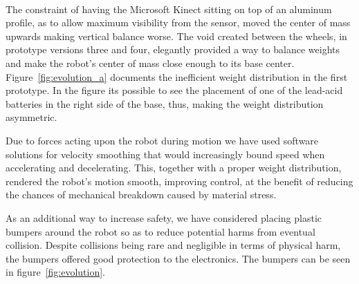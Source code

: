 The constraint of having the Microsoft Kinect\textsuperscript{\textregistered} sitting on top of an aluminum profile, as to allow maximum visibility from the sensor, moved the center of mass upwards making vertical balance worse. The void created between the wheels, in prototype versions three and four, elegantly provided a way to balance weights and make the robot's center of mass close enough to its base center. Figure~\ref{fig:evolution_a} documents the inefficient weight distribution in the first prototype. In the figure its possible to see the placement of one of the lead-acid batteries in the right side of the base, thus, making the weight distribution asymmetric.

Due to forces acting upon the robot during motion we have used software solutions for velocity smoothing that would increasingly bound speed when accelerating and decelerating. This, together with a proper weight distribution, rendered the robot's motion smooth, improving control, at the benefit of reducing the chances of mechanical breakdown caused by material stress.

As an additional way to increase safety, we have considered placing plastic bumpers around the robot so as to reduce potential harms from eventual collision. Despite collisions being rare and negligible in terms of physical harm, the bumpers offered good protection to the electronics. The bumpers can be seen in figure~\ref{fig:evolution}. %


